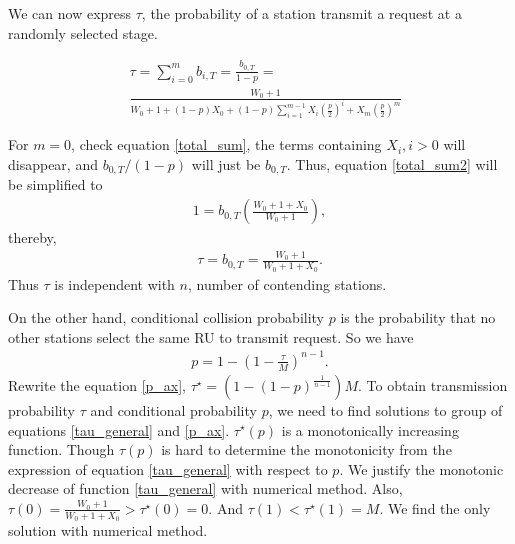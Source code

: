 \documentclass[journal]{IEEEtran}
\begin{document}
We can now express $\tau$, the probability of a station transmit a request at a randomly selected stage.

\begin{align}
\label{tau_general}
&\tau = \sum_{i=0}^m b_{i,T} = \frac{b_{0,T}}{1-p} = \nonumber \\
&\frac{W_0+1}{W_0+1+(1-p)X_0+(1-p) \sum_{i=1}^{m-1}X_i\left( \frac{p}{2}\right)^i+X_m\left( \frac{p}{2}\right)^m}
\end{align}

For $m=0$, check equation \ref{total_sum}, the terms containing $X_i, i>0$ will disappear, and $b_{0,T}/(1-p)$ will just be $b_{0,T}$.
Thus, equation \ref{total_sum2} will be simplified to 
\begin{align}
1 = b_{0,T}\left( \frac{W_0+1+X_0}{W_0+1}\right),
\end{align}
thereby, 
\begin{align}
\tau = b_{0,T} = \frac{W_0+1}{W_0+1+X_0}.
\label{tau_W0}
\end{align}
Thus $\tau$ is independent with $n$, number of contending stations.

On the other hand, conditional collision probability $p$ is the probability that no other stations select the same RU to transmit request. So we have 
\begin{align}
\label{p_ax}
p = 1-\left( 1-\frac{\tau}{M} \right)^{n-1}.
\end{align}
Rewrite the equation \ref{p_ax}, $\tau^\star = \left(1-(1-p)^\frac{1}{n-1} \right)M$. 
To obtain transmission probability $\tau$ and conditional probability $p$, we need to find solutions to group of equations \ref{tau_general} and \ref{p_ax}.
$\tau^\star(p)$ is a monotonically increasing function. 
Though $\tau(p)$ is hard to determine the monotonicity from the expression of equation \ref{tau_general} with respect to $p$. 
We justify the monotonic decrease of function \ref{tau_general} with numerical method. 
Also, $\tau(0) = \frac{W_0+1}{W_0+1+X_0}> \tau^\star(0) = 0$.
And $\tau(1) < \tau^\star(1) = M$. We find the only solution with numerical method.
\end{document}
